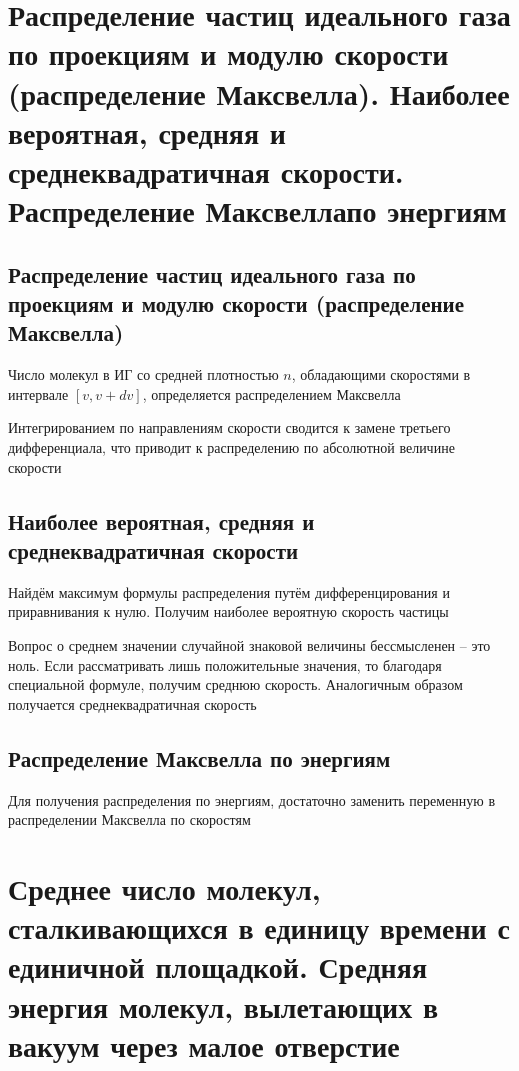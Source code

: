 \documentclass[a4paper, 14pt]{article}
\begin{document}
    \section{Распределение частиц идеального газа по проекциям и модулю скорости (распределение Максвелла).
    Наиболее вероятная, средняя и среднеквадратичная скорости.
    Распределение Максвеллапо энергиям}

    \subsection{Распределение частиц идеального газа по проекциям и модулю скорости (распределение Максвелла)}

    Число молекул в ИГ со средней плотностью $n$, обладающими скоростями в интервале $[v, v + dv]$, определяется
    распределением Максвелла

    Интегрированием по направлениям скорости сводится к замене третьего дифференциала, что приводит к распределению
    по абсолютной величине скорости

    \subsection{Наиболее вероятная, средняя и среднеквадратичная скорости}

    Найдём максимум формулы распределения путём дифференцирования и приравнивания к нулю.
    Получим наиболее вероятную скорость частицы

    Вопрос о среднем значении случайной знаковой величины бессмысленен -- это ноль.
    Если рассматривать лишь положительные значения, то благодаря специальной формуле, получим среднюю скорость.
    Аналогичным образом получается среднеквадратичная скорость

    \subsection{Распределение Максвелла по энергиям}

    Для получения распределения по энергиям, достаточно заменить переменную в распределении Максвелла по скоростям

    \section{Среднее число молекул, сталкивающихся в единицу времени с единичной площадкой.
    Средняя энергия молекул, вылетающих в вакуум через малое отверстие}
\end{document}
